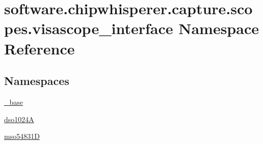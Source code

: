 \hypertarget{namespacesoftware_1_1chipwhisperer_1_1capture_1_1scopes_1_1visascope__interface}{}\section{software.\+chipwhisperer.\+capture.\+scopes.\+visascope\+\_\+interface Namespace Reference}
\label{namespacesoftware_1_1chipwhisperer_1_1capture_1_1scopes_1_1visascope__interface}
\subsection*{Namespaces}
\begin{DoxyCompactItemize}
\item 
 \hyperlink{namespacesoftware_1_1chipwhisperer_1_1capture_1_1scopes_1_1visascope__interface_1_1__base}{\+\_\+base}
\item 
 \hyperlink{namespacesoftware_1_1chipwhisperer_1_1capture_1_1scopes_1_1visascope__interface_1_1dso1024A}{dso1024\+A}
\item 
 \hyperlink{namespacesoftware_1_1chipwhisperer_1_1capture_1_1scopes_1_1visascope__interface_1_1mso54831D}{mso54831\+D}
\end{DoxyCompactItemize}
